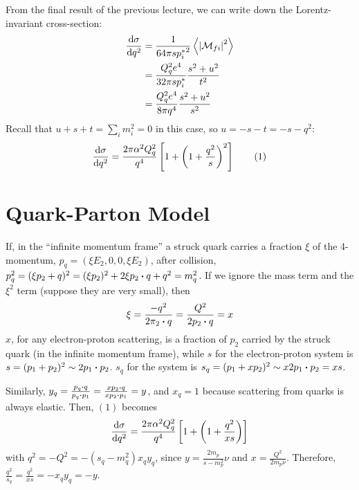 \documentclass[a4paper,twoside,master.tex]{subfiles}
\begin{document}

From the final result of the previous lecture, we can write down the Lorentz-invariant cross-section:
\begin{align}
    \dv{\sigma}{q^2} &= \frac{1}{64 \pi s {p_i^*}^2} \ev{\abs{\mathcal{M}_{fi}}^2} \\
                     &= \frac{Q_q^2 e^4}{32 \pi s p_i^*} \frac{s^2 + u^2}{t^2} \\
                     &= \frac{Q^2_q e^4}{8 \pi q^4} \frac{s^2 + u^2}{s^2}
\end{align}
Recall that $ u + s + t = \sum_i m_i^2 = 0 $ in this case, so $ u = -s-t = -s-q^2 $:
\begin{equation}
    \dv{\sigma}{q^2} = \frac{2 \pi \alpha^2 Q_q^2}{q^4} \left[ 1 + \left( 1 + \frac{q^2}{s} \right)^2 \right] \tag{1}
\end{equation}

\section{Quark-Parton Model}\label{sec:quark-parton_model}

If, in the ``infinite momentum frame'' a struck quark carries a fraction $ \xi $ of the 4-momentum, $ p_q = (\xi E_2, 0, 0, \xi E_2) $, after collision, $ p_q^2 = (\xi p_2 + q)^2 = (\xi p_2)^2 + 2 \xi p_2 \vdot q + q^2 = m_q^2 $. If we ignore the mass term and the $ \xi^2 $ term (suppose they are very small), then
\begin{equation}
    \xi = \frac{- q^2}{2 \pi_2 \vdot q} = \frac{Q^2}{2 p_2 \vdot q} = x
\end{equation}
$ x $, for any electron-proton scattering, is a fraction of $ p_2 $ carried by the struck quark (in the infinite momentum frame), while $ s $ for the electron-proton system is $ s = (p_1 + p_2)^2 \sim 2 p_1 \vdot p_2 $. $ s_q $ for the system is $ s_q = (p_1 + x p_2)^2 \sim x 2 p_1 \vdot p_2 = xs $.

Similarly, $ y_q = \frac{p_q \vdot q}{p_q \vdot p_1} = \frac{x p_2 \vdot q}{x p_2 \vdot p_1} = y $, and $ x_q = 1 $ because scattering from quarks is always elastic. Then, $ (1) $ becomes
\begin{equation}
    \dv{\sigma}{q^2} = \frac{2 \pi \alpha^2 Q_q^2}{q^4} \left[ 1 + \left( 1 + \frac{q^2}{xs} \right) \right]
\end{equation}
with $ q^2 = - Q^2 = - (s_q - m_q^2)x_q y_q $, since $ y = \frac{2 m_p}{s-m_p^2} \nu $ and $ x = \frac{Q^2}{2m_p \nu} $. Therefore, $ \frac{q^2}{s_q} = \frac{q^2}{xs} = - x_q y_q = -y $.
\end{document}
